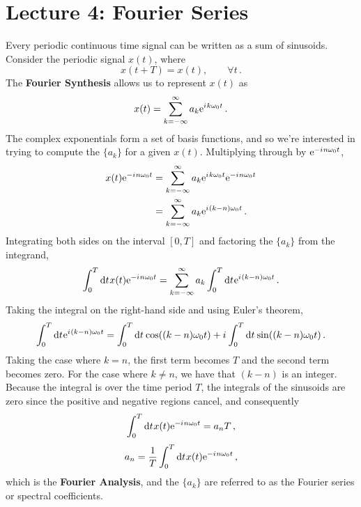 \section{Lecture 4: Fourier Series}

Every periodic continuous time signal can be written as a sum of sinusoids. Consider
the periodic signal $x(t)$, where
%
\begin{displaymath}
  x(t + T) = x(t), \qquad \forall t \,.
\end{displaymath}
%
The \textbf{Fourier Synthesis} allows us to represent $x(t)$ as
%
\begin{equation}
  x(t) = \sum_{k=-\infty}^\infty a_k\mathrm{e}^{{i\mkern1mu} k\omega_0 t} \,.
\end{equation}
%
The complex exponentials form a set of basis functions, and so we're interested in
trying to compute the $\{a_k\}$ for a given $x(t)$. Multiplying through by
$\mathrm{e}^{-{i\mkern1mu} n \omega_0 t}$,
%
\begin{align*}
  x(t)\mathrm{e}^{-{i\mkern1mu} n\omega_0 t} &= \sum_{k=-\infty}^\infty a_k\mathrm{e}^{{i\mkern1mu} k\omega_0 t}\mathrm{e}^{-{i\mkern1mu} n\omega_0 t} \\
  &= \sum_{k=-\infty}^\infty a_k\mathrm{e}^{{i\mkern1mu} (k-n)\omega_0 t} \,.
\end{align*}
%
Integrating both sides on the interval $[0,T]$ and factoring the $\{a_k\}$ from the integrand,
%
\begin{displaymath}
  \int_0^T \mathrm{d}t\mkern1mux(t)\mathrm{e}^{-{i\mkern1mu} n\omega_0 t} = \sum_{k=-\infty}^\infty a_k \int_0^T\mathrm{d}t\mkern1mu \mathrm{e}^{{i\mkern1mu} (k-n)\omega_0 t} \,.
\end{displaymath}
%
Taking the integral on the right-hand side and using Euler's theorem,
%
\begin{displaymath}
  \int_0^T\mathrm{d}t\mkern1mu \mathrm{e}^{{i\mkern1mu} (k-n)\omega_0 t} = \int_0^T\mathrm{d}t\mkern1mu \cos((k-n)\omega_0 t) + {i\mkern1mu}\int_0^T\mathrm{d}t\mkern1mu \sin((k-n)\omega_0 t) \,.
\end{displaymath}
%
Taking the case where $k=n$, the first term becomes $T$ and the second term becomes zero. For the
case where $k\neq n$, we have that $(k-n)$ is an integer. Because the integral is over the time
period $T$, the integrals of the sinusoids are zero since the positive and negative regions cancel,
and consequently
%
\begin{displaymath}
  \int_0^T \mathrm{d}t\mkern1mu x(t)\mathrm{e}^{-{i\mkern1mu} n\omega_0 t} = a_n T \,,
\end{displaymath}
%
\begin{equation}
  a_n = \frac{1}{T}\int_0^T \mathrm{d}t\mkern1mu x(t)\mathrm{e}^{-{i\mkern1mu} n\omega_0 t} \,,
\end{equation}
%
which is the \textbf{Fourier Analysis}, and the $\{a_k\}$ are referred to as the Fourier series or
spectral coefficients.

